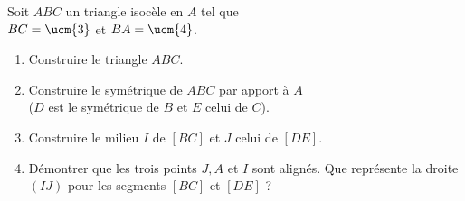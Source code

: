 \begin{colonne*exercice}


\begin{exercice} %
   Soit $ABC$ un triangle isocèle en $A$ tel que \\
   $BC=\ucm{3}$ et $BA=\ucm{4}$.
   \begin{enumerate}
      \item Construire le triangle $ABC$.
      \item Construire le symétrique de $ABC$ par apport à $A$ \\
         ($D$ est le symétrique de $B$ et $E$ celui de $C$).
      \item Construire le milieu $I$ de $[BC]$ et $J$ celui de $[DE]$.
      \item Démontrer que les trois points $J, A$ et $I$ sont alignés. Que représente la droite $(IJ)$ pour les segments $[BC]$ et $[DE]$ ?
   \end{enumerate}
\end{exercice}


\end{colonne*exercice}
